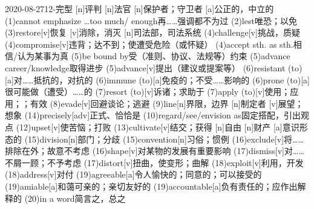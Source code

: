 \documentclass[12pt]{ctexart}
\begin{document}
\begin{wordlist}{2020-08-27}{12-完型}
  [n]{评判}
  [n]{法官}
  [n]{保护者；守卫者}
  [a]{公正的，中立的}
  \word(1){cannot emphasize \dots too much/ enough}{再……强调都不为过}
  \word(2){lest}{唯恐；以免}
  \word(3){restore}[v]{恢复}
  [v]{消除，消灭}
  [n]{司法部，司法系统}
  \word(4){challenge}[v]{挑战，质疑}
  \word(4){compromise}[v]{违背；达不到；使遭受危险（或怀疑）}
  \word(4){accept sth. as sth.}{相信/认为某事为真}
  \word(5){be bound by}{受（准则、协议、法规等）约束}
  \word(5){advance career/knowledge}{取得进步}
  \word(5){advance}[v]{提出（建议或提案等）}
  \word(6){resistant (to)}[a]{对……抵抗的，对抗的}
  \word(6){immune (to)}[a]{免疫的；不受……影响的}
  \word(6){prone (to)}[a]{很可能做（遭受）……的}
  \word(7){resort (to)}[v]{诉诸；求助于}
  \word(7){apply (to)}[v]{使用；应用；；有效}
  \word(8){evade}[v]{回避谈论；逃避}
  \word(9){line}[n]{界限，边界}
  [n]{制定者}
  [v]{展望；想象}
  \word(14){precisely}[adv]{正式、恰恰是}
  \word(10){regard/see/envision as}{固定搭配，引出观点}
  \word(12){upset}[v]{使苦恼；打败}
  \word(13){cultivate}[v]{结交；获得}
  [n]{自由}
  [n]{财产}
  [a]{意识形态的}
  \word(15){division}[n]{部门；分歧}
  \word(15){convention}[n]{习俗；惯例}
  \word(16){exclude}[v]{将……排除在外；故意不考虑}
  \word(16){shape}[v]{对某物的发展有重要影响}
  \word(17){dismiss}[v]{对……不屑一顾；不予考虑}
  \word(17){distort}[v]{扭曲，使变形；曲解}
  \word(18){exploit}[v]{利用，开发}
  \word(18){address}[v]{对付}
  \word(19){agreeable}[a]{令人愉快的；同意的；可以接受的}
  \word(19){amiable}[a]{和蔼可亲的；亲切友好的}
  \word(19){accountable}[a]{负有责任的；应作出解释的}
  \word(20){in a word}{简言之，总之}
\end{wordlist}
\end{document}
